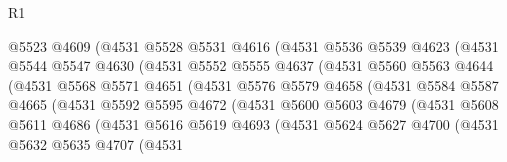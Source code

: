 \begin{lexlean}{R1}
\begin{coremodule}
                        @5523
                        @4609
                        (@4531
                          @5528
                          @5531
                          @4616
                          (@4531
                            @5536
                            @5539
                            @4623
                            (@4531
                              @5544
                              @5547
                              @4630
                              (@4531
                                @5552
                                @5555
                                @4637
                                (@4531
                                  @5560
                                  @5563
                                  @4644
                                  (@4531
                                    @5568
                                    @5571
                                    @4651
                                    (@4531
                                      @5576
                                      @5579
                                      @4658
                                      (@4531
                                        @5584
                                        @5587
                                        @4665
                                        (@4531
                                          @5592
                                          @5595
                                          @4672
                                          (@4531
                                            @5600
                                            @5603
                                            @4679
                                            (@4531
                                              @5608
                                              @5611
                                              @4686
                                              (@4531
                                                @5616
                                                @5619
                                                @4693
                                                (@4531
                                                  @5624
                                                  @5627
                                                  @4700
                                                  (@4531
                                                    @5632
                                                    @5635
                                                    @4707
                                                    (@4531

\end{coremodule}
\end{lexlean}
